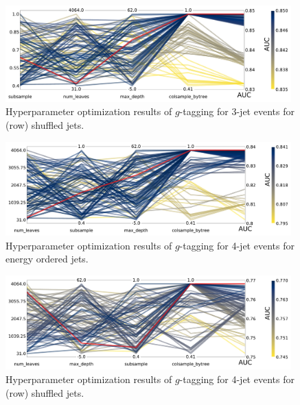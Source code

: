 \begin{figure}[h!]
  \includegraphics[width=0.98\textwidth, trim=0 0 0 0, clip]{figures/quarks/CV_viz-njet=3-name=lf_gtag_shuffled_lgb_down_sample=1.00-ML_vars=vertex-selection=b-ejet_min=4-n_iter_RS_lgb=99-n_iter_RS_xgb=9-cdot_cut=0.90-version=19.pdf}
  \caption[Parallel Plot of HPO Results for 3-Jet $g$-Tagging for Shuffled Jets]
          {Hyperparameter optimization results of $g$-tagging for 3-jet events for (row) shuffled jets. 
          } 
  \label{fig:q:CV_res_parallel_coords_g_tag_3j_shuffled}
\end{figure}

\begin{figure}[h!]
  \includegraphics[width=0.98\textwidth, trim=0 0 0 0, clip]{figures/quarks/CV_viz-njet=4-name=lf_gtag_energy_ordered_lgb_down_sample=1.00-ML_vars=vertex-selection=b-ejet_min=4-n_iter_RS_lgb=99-n_iter_RS_xgb=9-cdot_cut=0.90-version=19.pdf}
  \caption[Parallel Plot of HPO Results for 4-Jet $g$-Tagging for Energy Ordered Jets]
          {Hyperparameter optimization results of $g$-tagging for 4-jet events for energy ordered jets. 
          } 
  \label{fig:q:CV_res_parallel_coords_g_tag_4j_energy_ordered}
\end{figure}


\begin{figure}[h!]
  \includegraphics[width=0.98\textwidth, trim=0 0 0 0, clip]{figures/quarks/CV_viz-njet=4-name=lf_gtag_shuffled_lgb_down_sample=1.00-ML_vars=vertex-selection=b-ejet_min=4-n_iter_RS_lgb=99-n_iter_RS_xgb=9-cdot_cut=0.90-version=19.pdf}
  \caption[Parallel Plot of HPO Results for 4-Jet $g$-Tagging for Shuffled Jets]
          {Hyperparameter optimization results of $g$-tagging for 4-jet events for (row) shuffled jets. 
          } 
  \label{fig:q:CV_res_parallel_coords_g_tag_4j_shuffled}
\end{figure}

